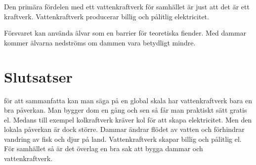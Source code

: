 \documentclass[11p]{article}
\begin{document}
    Den primära fördelen med ett vattenkraftverk för samhället är just att det är ett kraftverk.
    Vattenkraftverk producerar billig och pålitlig elektricitet.

    Försvaret kan använda älvar som en barrier för teoretiska fiender.
    Med dammar kommer älvarna nedströms om dammen vara betydligt mindre.
    \parencite{VattenkraftForOchEmot}

    \section{Slutsatser}
    för att sammanfatta kan man säga på en global skala har vattenkraftverk bara en bra påverkan.
    Man bygger dom en gång och sen så får man praktiskt sätt gratis el.
    Medans till exempel kolkraftverk kräver kol för att skapa elektricitet.
    Men den lokala påverkan är dock större.
    Dammar ändrar flödet av vatten och förhindrar vandring av fisk och djur på land.
    Vattenkraftverk skapar billig och pålitlig el.
    För samhället så är det överlag en bra sak att bygga dammar och vattenkraftverk.

    \printbibliography
\end{document}
